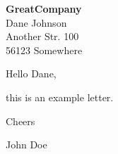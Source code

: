 \begin{letter}{\textbf{GreatCompany} \\ Dane Johnson \\ Another Str. 100 \\ 56123 Somewhere}
\onehalfspacing
{}
\opening{Hello Dane,}

this is an example letter.

\vspace{\baselineskip}

Cheers

John Doe
\end{letter}
